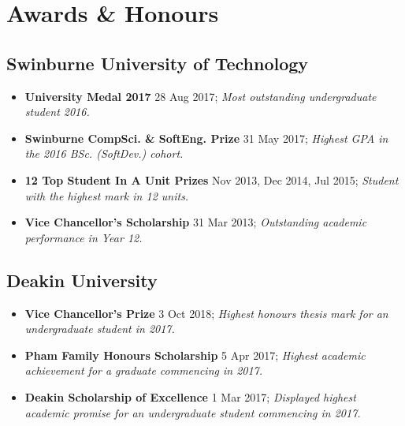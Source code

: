 \vspace{-3mm}
\section{Awards \& Honours}
\small

\begin{multicols}{2}
\raggedright

\subsection{Swinburne University of Technology}

\begin{itemize}
  \item \textbf{University Medal 2017} 28 Aug 2017; \textit{Most outstanding undergraduate student 2016.}
  \item \textbf{Swinburne CompSci. \& SoftEng. Prize} 31 May 2017; \textit{Highest GPA in the 2016 BSc. (SoftDev.) cohort.}
  \item \textbf{12 Top Student In A Unit Prizes} Nov 2013, Dec 2014, Jul 2015; \textit{Student with the highest mark in 12 units.}
  \item \textbf{Vice Chancellor's Scholarship} 31 Mar 2013; \textit{Outstanding academic performance in Year 12.}
\end{itemize}

\subsection{Deakin University}

\begin{itemize}
  \item \textbf{Vice Chancellor's Prize} 3 Oct 2018; \textit{Highest honours thesis mark for an undergraduate student in 2017.}
  \item \textbf{Pham Family Honours Scholarship} 5 Apr 2017; \textit{Highest academic achievement for a graduate commencing in 2017.}
  \item \textbf{Deakin Scholarship of Excellence} 1 Mar 2017; \textit{Displayed highest academic promise for an undergraduate student commencing in 2017.}
\end{itemize}


\end{multicols}
